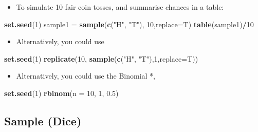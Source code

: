 \documentclass[]{article}
\newenvironment{Shaded}{\begin{snugshade}}{\end{snugshade}}
\newcommand{\DataTypeTok}[1]{\textcolor[rgb]{0.13,0.29,0.53}{#1}}
\newcommand{\DecValTok}[1]{\textcolor[rgb]{0.00,0.00,0.81}{#1}}
\newcommand{\FloatTok}[1]{\textcolor[rgb]{0.00,0.00,0.81}{#1}}
\newcommand{\KeywordTok}[1]{\textcolor[rgb]{0.13,0.29,0.53}{\textbf{#1}}}
\newcommand{\NormalTok}[1]{#1}
\newcommand{\OperatorTok}[1]{\textcolor[rgb]{0.81,0.36,0.00}{\textbf{#1}}}
\newcommand{\StringTok}[1]{\textcolor[rgb]{0.31,0.60,0.02}{#1}}
\providecommand{\tightlist}{%
  \setlength{\itemsep}{0pt}\setlength{\parskip}{0pt}}
\begin{document}
\begin{itemize}
\tightlist
\item
  To simulate 10 fair coin tosses, and summarise chances in a table:
\end{itemize}

\begin{Shaded}
\begin{Highlighting}[]
\KeywordTok{set.seed}\NormalTok{(}\DecValTok{1}\NormalTok{)}
\NormalTok{sample1 =}\StringTok{ }\KeywordTok{sample}\NormalTok{(}\KeywordTok{c}\NormalTok{(}\StringTok{"H"}\NormalTok{, }\StringTok{"T"}\NormalTok{), }\DecValTok{10}\NormalTok{,}\DataTypeTok{replace=}\NormalTok{T)}
\KeywordTok{table}\NormalTok{(sample1)}\OperatorTok{/}\DecValTok{10}
\end{Highlighting}
\end{Shaded}

\begin{itemize}
\tightlist
\item
  Alternatively, you could use
\end{itemize}

\begin{Shaded}
\begin{Highlighting}[]
\KeywordTok{set.seed}\NormalTok{(}\DecValTok{1}\NormalTok{)}
\KeywordTok{replicate}\NormalTok{(}\DecValTok{10}\NormalTok{, }\KeywordTok{sample}\NormalTok{(}\KeywordTok{c}\NormalTok{(}\StringTok{"H"}\NormalTok{, }\StringTok{"T"}\NormalTok{),}\DecValTok{1}\NormalTok{,}\DataTypeTok{replace=}\NormalTok{T))}
\end{Highlighting}
\end{Shaded}

\begin{itemize}
\tightlist
\item
  Alternatively, you could use the Binomial *,
\end{itemize}

\begin{Shaded}
\begin{Highlighting}[]
\KeywordTok{set.seed}\NormalTok{(}\DecValTok{1}\NormalTok{)}
\KeywordTok{rbinom}\NormalTok{(}\DataTypeTok{n =} \DecValTok{10}\NormalTok{, }\DecValTok{1}\NormalTok{, }\FloatTok{0.5}\NormalTok{)}
\end{Highlighting}
\end{Shaded}

\hypertarget{sample-dice}{%
\subsection{Sample (Dice)}\label{sample-dice}}
\end{document}
